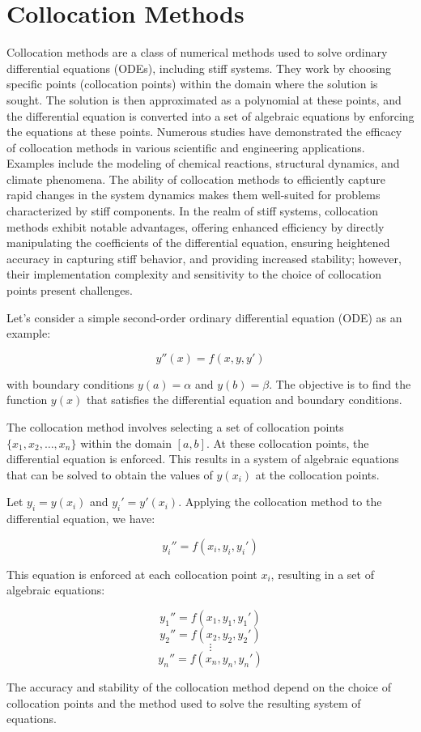   

\section{Collocation Methods}
Collocation methods are a class of numerical methods used to solve ordinary differential equations (ODEs), including stiff systems. They work by choosing specific points (collocation points) within the domain where the solution is sought. The solution is then approximated as a polynomial at these points, and the differential equation is converted into a set of algebraic equations by enforcing the equations at these points.
Numerous studies have demonstrated the efficacy of collocation methods in various scientific and engineering applications. Examples include the modeling of chemical reactions, structural dynamics, and climate phenomena. The ability of collocation methods to efficiently capture rapid changes in the system dynamics makes them well-suited for problems characterized by stiff components.
In the realm of stiff systems, collocation methods exhibit notable advantages, offering enhanced efficiency by directly manipulating the coefficients of the differential equation, ensuring heightened accuracy in capturing stiff behavior, and providing increased stability; however, their implementation complexity and sensitivity to the choice of collocation points present challenges\cite{Faleichik2009ExplicitIO}.

Let's consider a simple second-order ordinary differential equation (ODE) as an example:

\[
y''(x) = f(x, y, y')
\]

with boundary conditions \(y(a) = \alpha\) and \(y(b) = \beta\). The objective is to find the function \(y(x)\) that satisfies the differential equation and boundary conditions.

The collocation method involves selecting a set of collocation points \(\{x_1, x_2, \ldots, x_n\}\) within the domain \([a, b]\). At these collocation points, the differential equation is enforced. This results in a system of algebraic equations that can be solved to obtain the values of \(y(x_i)\) at the collocation points.

Let \(y_i = y(x_i)\) and \(y_i' = y'(x_i)\). Applying the collocation method to the differential equation, we have:

\[
y_i'' = f(x_i, y_i, y_i')
\]

This equation is enforced at each collocation point \(x_i\), resulting in a set of algebraic equations:

\[
y_1'' = f(x_1, y_1, y_1')
\]
\[
y_2'' = f(x_2, y_2, y_2')
\]
\[
\vdots
\]
\[
y_n'' = f(x_n, y_n, y_n')
\]

 The accuracy and stability of the collocation method depend on the choice of collocation points and the method used to solve the resulting system of equations.



